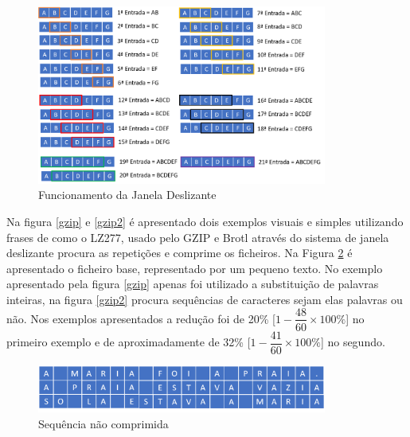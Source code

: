 \begin{figure}[htb]
\centering
\includegraphics[width=0.85\textwidth]{images/janeladeslizantedicionario.png}
\caption{Funcionamento da Janela Deslizante}\label{janela}
\end{figure}


\par Na figura \ref{gzip} e \ref{gzip2} é apresentado dois exemplos visuais e simples utilizando frases de como o LZ277, usado pelo GZIP e Brotl através do sistema de janela deslizante procura as repetições e comprime os ficheiros. Na Figura \ref{unzip} é apresentado o ficheiro base, representado por um pequeno texto. No exemplo apresentado pela figura \ref{gzip} apenas foi utilizado a substituição de palavras inteiras, na figura \ref{gzip2} procura sequências de caracteres sejam elas palavras ou não. Nos exemplos apresentados a redução foi de 20\% [$1-\dfrac{48}{60}\times100\%$] no primeiro exemplo e de aproximadamente de 32\% [$1-\dfrac{41}{60}\times100\%$] no segundo.
\begin{figure}[htb]
\centering
\includegraphics[width=0.85\textwidth]{images/FILE.png}
\caption{Sequência não comprimida}\label{unzip}
\end{figure}

